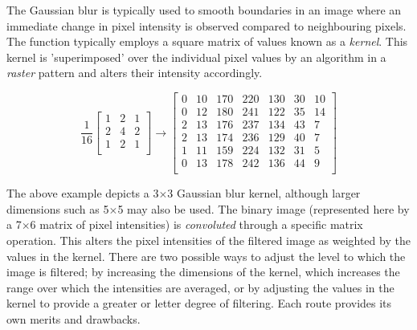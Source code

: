 \documentclass{article}
\begin{document}
	The Gaussian blur is typically used to smooth boundaries in an image where an immediate change in pixel intensity is observed compared to neighbouring pixels. The function typically employs a square matrix of values known as a \textit{kernel}. This kernel is 'superimposed' over the individual pixel values by an algorithm in a \textit{raster} pattern and alters their intensity accordingly.
	
	\[
	\frac{1}{16}
	\begin{bmatrix} 
		1 & 2 & 1 \\
		2 & 4 & 2\\
		1 & 2 & 1 \\
	\end{bmatrix}
	\longrightarrow
	\begin{bmatrix}
		0 & 10 & 170 & 220 & 130 & 30 & 10\\
		0 & 12 & 180 & 241 & 122 & 35 & 14\\
		2 & 13 & 176 & 237 & 134 & 43 & 7\\
		2 & 13 & 174 & 236 & 129 & 40 & 7\\
		1 & 11 & 159 & 224 & 132 & 31 & 5\\
		0 & 13 & 178 & 242 & 136 & 44 & 9\\
	\end{bmatrix}
	\]
	
	The above example depicts a 3$\times$3 Gaussian blur kernel, although larger dimensions such as 5$\times$5 may also be used. The binary image (represented here by a 7$\times$6 matrix of pixel intensities) is \textit{convoluted} through a specific matrix operation. This alters the pixel intensities of the filtered image as weighted by the values in the kernel. There are two possible ways to adjust the level to which the image is filtered; by increasing the dimensions of the kernel, which increases the range over which the intensities are averaged, or by adjusting the values in the kernel to provide a greater or letter degree of filtering. Each route provides its own merits and drawbacks.
	\\
	
\end{document}
